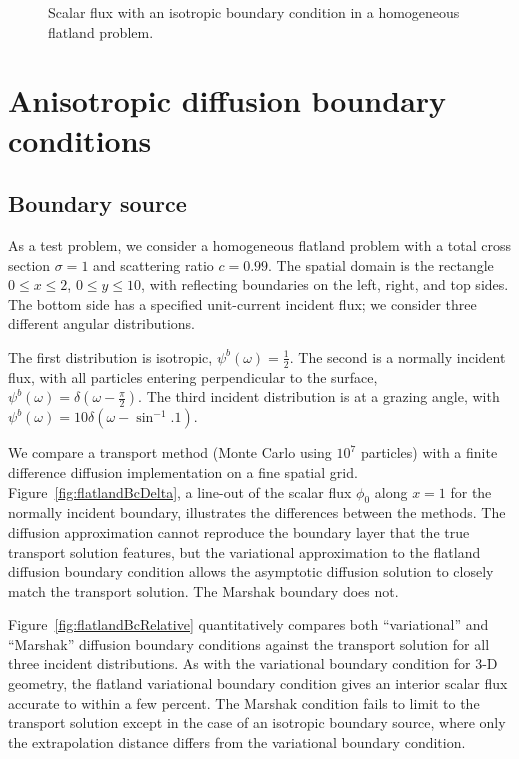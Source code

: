 \begin{figure}[htb!]
  \centering\small
  \hspace{-.5in}
  
  \hspace{-.5in}
  \caption{Scalar flux with an isotropic boundary condition in a homogeneous
  flatland problem.}
  \label{fig:isotropic}
\end{figure}

\section{Anisotropic diffusion boundary conditions}

\subsection{Boundary source}
As a test problem, we consider a homogeneous flatland problem with a
total cross section $\sigma=1$ and scattering ratio $c=0.99$. The spatial 
domain is the rectangle $0 \le x \le 2$, \linebreak $0 \le y \le 10$, with
reflecting boundaries on the left,
right, and top sides. The bottom side has a specified unit-current incident
flux; we consider three different angular
distributions.

The first distribution is isotropic, $\psi^b(\omega) = \frac{1}{2}$. The second
is a normally incident flux, with all particles entering
perpendicular to the surface, $\psi^b(\omega) = \delta(\omega -
\frac{\pi}{2})$. The third incident distribution is at a grazing angle, with 
$\psi^b(\omega) = 10 \delta(\omega - \sin^{-1}.1)$.

We compare a transport method (Monte Carlo using $10^7$ particles)
with a finite difference diffusion implementation on a fine spatial grid.
Figure~\ref{fig:flatlandBcDelta},
 a line-out of the scalar flux $\phi_0$ along
$x=1$ for the normally incident boundary, illustrates the differences between
the methods. The diffusion
approximation cannot reproduce the boundary layer that the true transport
solution features, but the variational approximation to the flatland
diffusion boundary condition allows the asymptotic diffusion solution to
closely match the transport solution. The Marshak boundary does not.

Figure~\ref{fig:flatlandBcRelative} quantitatively compares both ``variational'' and
``Marshak'' diffusion boundary conditions against the transport solution
for all three incident distributions.  
As with the variational boundary condition for 3-D geometry, the flatland
variational boundary condition gives an interior scalar flux accurate to within
a few percent. The Marshak condition fails to limit to the transport solution except in
the case of an isotropic boundary source, where only the extrapolation
distance differs from the variational boundary condition.


